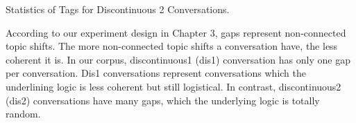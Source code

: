 \documentclass[bsc,frontabs,twoside,singlespacing,parskip,deptreport]{infthesis}     %
\begin{document}
\begin{minipage}{\textwidth}
\begin{minipage}[t]{0.45\textwidth}
        \end{minipage}
        \begin{minipage}[t]{0.45\textwidth}
        \centering
        \makeatletter{}\makeatother
{}
\caption{Statistics of Tags for Discontinuous 2  Conversations.}
\label{tab:dis2}

        \end{minipage}
    \end{minipage}



According to our experiment design in Chapter 3, gaps represent non-connected topic shifts. The more non-connected topic shifts a conversation have, the less coherent it is. In our corpus, discontinuous1 (dis1) conversation has only one gap per conversation. Dis1 conversations represent conversations which the underlining logic is less coherent but still logistical. In contrast, discontinuous2 (dis2) conversations have many gaps, which the underlying logic is totally random.  
\end{document}

